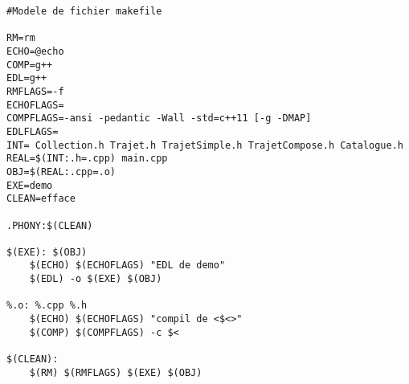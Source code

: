 \begin{verbatim}
#Modele de fichier makefile

RM=rm
ECHO=@echo
COMP=g++
EDL=g++
RMFLAGS=-f
ECHOFLAGS=
COMPFLAGS=-ansi -pedantic -Wall -std=c++11 [-g -DMAP]
EDLFLAGS=
INT= Collection.h Trajet.h TrajetSimple.h TrajetCompose.h Catalogue.h
REAL=$(INT:.h=.cpp) main.cpp
OBJ=$(REAL:.cpp=.o)
EXE=demo
CLEAN=efface

.PHONY:$(CLEAN)

$(EXE): $(OBJ)
	$(ECHO) $(ECHOFLAGS) "EDL de demo"
	$(EDL) -o $(EXE) $(OBJ)

%.o: %.cpp %.h
	$(ECHO) $(ECHOFLAGS) "compil de <$<>"
	$(COMP) $(COMPFLAGS) -c $<

$(CLEAN):
	$(RM) $(RMFLAGS) $(EXE) $(OBJ)
\end{verbatim}
